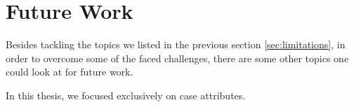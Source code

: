 




\section{Future Work}
Besides tackling the topics we listed in the previous section \ref{sec:limitations},
in order to overcome some of the faced challenges,
there are some other topics one could look at for future work.

In this thesis, we focused exclusively on case attributes.







